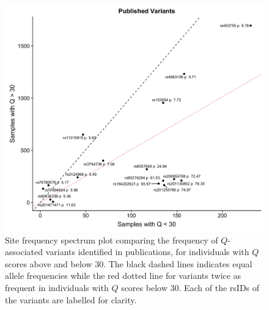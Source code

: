 \documentclass[9pt,article]{template}
\begin{document}
\begin{figure}[tbp]
\centering
\includegraphics[width=15cm,keepaspectratio]{Published_OverUnder30.jpg}
\caption{Site frequency spectrum plot comparing the frequency of $Q$-associated variants identified in publications, for individuals with $Q$ scores above and below 30. The black dashed lines indicates equal allele frequencies while the red dotted line for variants twice as frequent in individuals with $Q$ scores below 30. Each of the rsIDs of the variants are labelled for clarity.}  
\label{Pub_30}
\end{figure}
\end{document}
